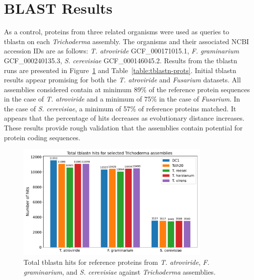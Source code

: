 \section{BLAST Results}\label{section:blast}

As a control, proteins from three related organisms were used as
queries to tblastn\cite{altschul1990a} on each \textit{Trichoderma}
assembly. The organisms and their associated NCBI accession IDs are as
follows: \textit{T. atroviride} \- GCF\_000171015.1,
\textit{F. graminarium} \- GCF\_000240135.3, \textit{S. cerevisiae} \-
GCF\_000146045.2.  Results from the tblastn runs are presented in
Figure~\ref{fig:blast-total-counts} and Table~\ref{table:tblastn-prots}. Initial tblastn results appear
promising for both the \textit{T. atroviride} and \textit{Fusarium}
datasets. All assemblies considered contain at minimum 89\% of the
reference protein sequences in the case of \textit{T. atroviride} and
a minimum of 75\% in the case of \textit{Fusarium}. In the case of
\textit{S. cerevisiae}, a minimum of 57\% of reference proteins
matched. It appears that the percentage of hits decreases as
evolutionary distance increases. These results provide rough
validation that the assemblies contain potential for protein coding
sequences.

\begin{figure}
  \centering
  \includegraphics[width=0.85\textwidth]{figures/blast-total-counts.pdf}
  \caption[Total tblastn hits]{Total tblastn hits for reference proteins from \textit{T. atroviride}, \textit{F. graminarium}, and \textit{S. cerevisiae} against \textit{Trichoderma} assemblies.}\label{fig:blast-total-counts}
\end{figure}

